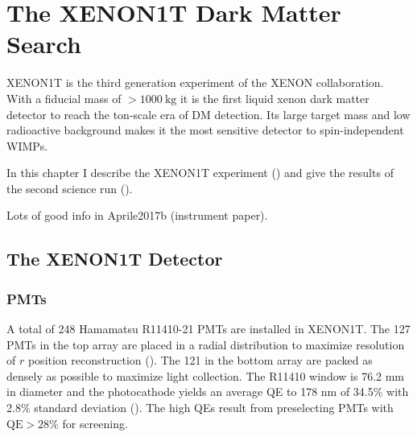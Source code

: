 

\pagestyle{cu}
\graphicspath{{./Chapter3/Figures/}}
\chapter[The XENON1T Dark Matter Search][The XENON1T Dark Matter Search]{The XENON1T Dark Matter Search}



XENON1T is the third generation experiment of the XENON collaboration.  With a fiducial mass of $> 1000\ \mathrm{kg}$ it is the first
liquid xenon dark matter detector to reach the ton-scale era of DM detection.  Its large target mass and low radioactive background
makes it the most sensitive detector to spin-independent WIMPs.

In this chapter I describe the XENON1T experiment () and give the results of the second science run
().

Lots of good info in Aprile2017b (instrument paper).

\section{The XENON1T Detector}
\label{sec:xenon1t_detector}




\subsection{PMTs}
\label{subsec:xenon1t_pmts}
A total of 248 Hamamatsu R11410-21 PMTs are installed in XENON1T.  The 127 PMTs in the top array are placed in a radial distribution to
maximize resolution of $r$ position reconstruction ().  The 121 in the bottom array
are packed as densely as possible to maximize light
collection.  The R11410 window is 76.2 mm in diameter and the photocathode yields an average QE to 178 nm of 34.5\% with 2.8\%
standard deviation ().  The high QEs result from preselecting PMTs with $\mathrm{QE} > 28\%$ for
screening.

